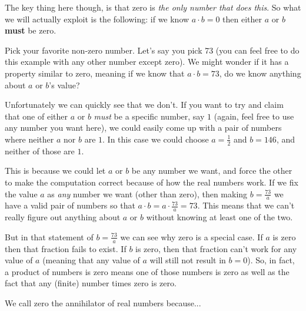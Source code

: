 \documentclass{ximera}
\begin{document}
    The key thing here though, is that zero is \textit{the only number that does this}. So what we will actually exploit is the following: if we know $a \cdot b = 0$ then either $a$ or $b$ \textbf{must} be zero.
    
    \begin{explanation}%
        Pick your favorite non-zero number. Let's say you pick 73 (you can feel free to do this example with any other number except zero). We might wonder if it has a property similar to zero, meaning if we know that $a \cdot b = 73$, do we know anything about $a$ or $b$'s value?
    
        Unfortunately we can quickly see that we don't. If you want to try and claim that one of either $a$ or $b$ \textit{must} be a specific number, say $1$ (again, feel free to use any number you want here), we could easily come up with a pair of numbers where neither $a$ nor $b$ are $1$. In this case we could choose $a = \frac{1}{2}$ and $b = 146$, and neither of those are $1$. 
        
        This is because we could let $a$ or $b$ be any number we want, and force the other to make the computation correct because of how the real numbers work. If we fix the value $a$ as \textit{any} number we want (other than zero), then making $b = \frac{73}{a}$ we have a valid pair of numbers so that $a \cdot b = a \cdot \frac{73}{a} =73$. This means that we can't really figure out anything about $a$ or $b$ without knowing at least one of the two.
    
        But in that statement of $b = \frac{73}{a}$ we can see why zero is a special case. If $a$ is zero then that fraction fails to exist. If $b$ is zero, then that fraction can't work for any value of $a$ (meaning that any value of $a$ will still not result in $b = 0$). So, in fact, a product of numbers is zero means one of those numbers is zero as well as the fact that any (finite) number times zero is zero.
    
    \end{explanation}%
    
    \begin{problem}
        We call zero the annihilator of real numbers because...
        \begin{multipleChoice}
        \end{multipleChoice}
    \end{problem}
\end{document}
